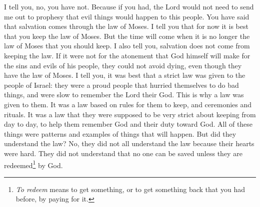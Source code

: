 I tell you, no, you have not. Because if you had, the Lord would not need to send me out to prophesy that evil things would happen to this people.
\bverse \iffalse And now ye have said that salvation cometh by the law of Moses. I say unto you that it is expedient that ye should keep the law of Moses as yet; but I say unto you, that the time shall come when it shall no more be expedient to keep the law of Moses. \fi
You have said that salvation comes through the law of Moses. I tell you that for now it is best that you keep the law of Moses. But the time will come when it is no longer the law of Moses that you should keep.
\bverse \iffalse And moreover, I say unto you, that salvation doth not come by the law alone; and were it not for the atonement, which God himself shall make for the sins and iniquities of his people, that they must unavoidably perish, notwithstanding the law of Moses. \fi
I also tell you, salvation does not come from keeping the law. If it were not for the atonement that God himself will make for the sins and evils of his people, they could not avoid dying, even though they have the law of Moses.
\bverse \iffalse And now I say unto you that it was expedient that there should be a law given to the children of Israel, yea, even a very strict law; for they were a stiffnecked people, quick to do iniquity, and slow to remember the Lord their God; \fi
I tell you, it was best that a strict law was given to the people of Israel: they were a proud people that hurried themselves to do bad things, and were slow to remember the Lord their God.
\bverse \iffalse Therefore there was a law given them, yea, a law of performances and of ordinances, a law which they were to observe strictly from day to day, to keep them in remembrance of God and their duty towards him. \fi
This is why a law was given to them. It was a law based on rules for them to keep, and ceremonies and rituals. It was a law that they were supposed to be very strict about keeping from day to day, to help them remember God and their duty toward God.
\bverse \iffalse But behold, I say unto you, that all these things were types of things to come. \fi
All of these things were patterns and examples of things that will happen.
\bverse \iffalse And now, did they understand the law? I say unto you, Nay, they did not all understand the law; and this because of the hardness of their hearts; for they understood not that there could not any man be saved except it were through the redemption of God. \fi
But did they understand the law? No, they did not all understand the law because their hearts were hard. They did not understand that no one can be saved unless they are redeemed\footnote{\textit{To redeem} means to get something, or to get something back that you had before, by paying for it.} by God.
